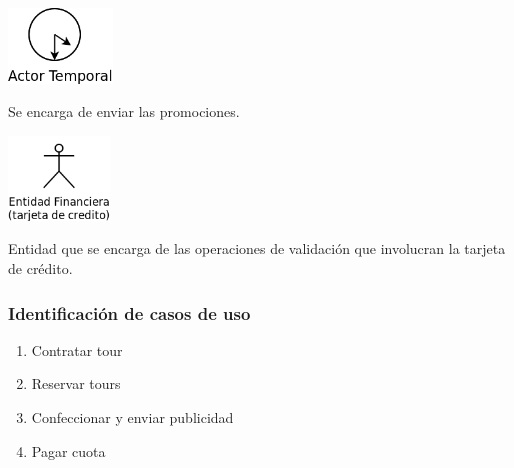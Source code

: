 \documentclass[12pt,a4paper,titlepage,oneside]{article}
\begin{document}
\vspace*{1.5cm}

\begin{minipage}[b]{0.2\linewidth}\centering
	\includegraphics[height=2cm]{actor_temporal}
\end{minipage}
\begin{minipage}[b]{0.8\linewidth}\centering
	\begin{flushleft}
	Se encarga de enviar las promociones. \\
	\end{flushleft}
\end{minipage}

\vspace*{1.5cm}


\begin{minipage}[b]{0.2\linewidth}\centering
	\includegraphics[height=2.25cm]{entidadFinanciera}
\end{minipage}
\begin{minipage}[b]{0.8\linewidth}\centering
	\begin{flushleft}
Entidad que se encarga de las operaciones de validación que involucran la tarjeta de crédito. \\
	\end{flushleft}
\end{minipage}


\vspace*{1.5cm}



\newpage

\subsubsection{Identificación de casos de uso}

\begin{enumerate}
\item Contratar tour
\item Reservar tours
\item Confeccionar y enviar publicidad
\item Pagar cuota
\end{enumerate}
\end{document}
